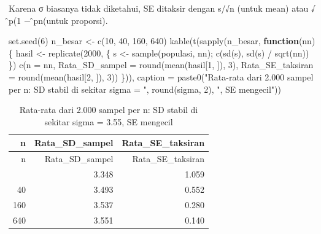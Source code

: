 \documentclass[
  indonesian,
  letterpaper,
]{book}
\newenvironment{Shaded}{\begin{snugshade}}{\end{snugshade}}
\newcommand{\AttributeTok}[1]{\textcolor[rgb]{0.40,0.45,0.13}{#1}}
\newcommand{\ControlFlowTok}[1]{\textcolor[rgb]{0.00,0.23,0.31}{\textbf{#1}}}
\newcommand{\DecValTok}[1]{\textcolor[rgb]{0.68,0.00,0.00}{#1}}
\newcommand{\FunctionTok}[1]{\textcolor[rgb]{0.28,0.35,0.67}{#1}}
\newcommand{\NormalTok}[1]{\textcolor[rgb]{0.00,0.23,0.31}{#1}}
\newcommand{\OtherTok}[1]{\textcolor[rgb]{0.00,0.23,0.31}{#1}}
\newcommand{\SpecialCharTok}[1]{\textcolor[rgb]{0.37,0.37,0.37}{#1}}
\newcommand{\StringTok}[1]{\textcolor[rgb]{0.13,0.47,0.30}{#1}}
\begin{document}
Karena σ biasanya tidak diketahui, SE ditaksir dengan s/√n (untuk mean)
atau √ ̂p(1 − ̂pn(untuk proporsi).

\begin{Shaded}
\begin{Highlighting}[]
\FunctionTok{set.seed}\NormalTok{(}\DecValTok{6}\NormalTok{)}
\NormalTok{n\_besar }\OtherTok{\textless{}{-}} \FunctionTok{c}\NormalTok{(}\DecValTok{10}\NormalTok{, }\DecValTok{40}\NormalTok{, }\DecValTok{160}\NormalTok{, }\DecValTok{640}\NormalTok{)}
\FunctionTok{kable}\NormalTok{(}\FunctionTok{t}\NormalTok{(}\FunctionTok{sapply}\NormalTok{(n\_besar, }\ControlFlowTok{function}\NormalTok{(nn) \{}
\NormalTok{hasil }\OtherTok{\textless{}{-}} \FunctionTok{replicate}\NormalTok{(}\DecValTok{2000}\NormalTok{, \{ s }\OtherTok{\textless{}{-}} \FunctionTok{sample}\NormalTok{(populasi, nn); }\FunctionTok{c}\NormalTok{(}\FunctionTok{sd}\NormalTok{(s), }\FunctionTok{sd}\NormalTok{(s) }\SpecialCharTok{/} \FunctionTok{sqrt}\NormalTok{(nn))}
\NormalTok{\})}
\FunctionTok{c}\NormalTok{(}\AttributeTok{n =}\NormalTok{ nn, }\AttributeTok{Rata\_SD\_sampel =} \FunctionTok{round}\NormalTok{(}\FunctionTok{mean}\NormalTok{(hasil[}\DecValTok{1}\NormalTok{, ]), }\DecValTok{3}\NormalTok{),}
\AttributeTok{Rata\_SE\_taksiran =} \FunctionTok{round}\NormalTok{(}\FunctionTok{mean}\NormalTok{(hasil[}\DecValTok{2}\NormalTok{, ]), }\DecValTok{3}\NormalTok{))}
\NormalTok{\})), }\AttributeTok{caption =} \FunctionTok{paste0}\NormalTok{(}\StringTok{"Rata{-}rata dari 2.000 sampel per n: SD stabil di sekitar}
\StringTok{sigma = "}\NormalTok{,}
\FunctionTok{round}\NormalTok{(sigma, }\DecValTok{2}\NormalTok{), }\StringTok{", SE mengecil"}\NormalTok{))}
\end{Highlighting}
\end{Shaded}

\begin{longtable}[]{@{}rrr@{}}
\caption{Rata-rata dari 2.000 sampel per n: SD stabil di sekitar sigma =
3.55, SE mengecil}\tabularnewline
\toprule\noalign{}
n & Rata\_SD\_sampel & Rata\_SE\_taksiran \\
\midrule\noalign{}
\endfirsthead
\toprule\noalign{}
n & Rata\_SD\_sampel & Rata\_SE\_taksiran \\
\midrule\noalign{}
\endhead
\bottomrule\noalign{}
\endlastfoot
10 & 3.348 & 1.059 \\
40 & 3.493 & 0.552 \\
160 & 3.537 & 0.280 \\
640 & 3.551 & 0.140 \\
\end{longtable}
\end{document}
